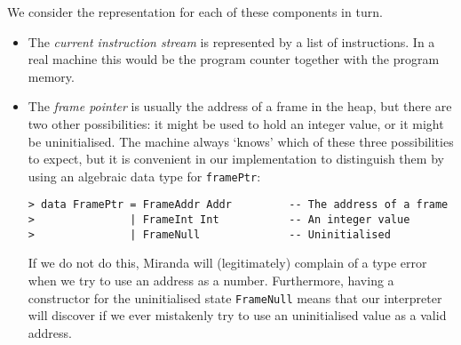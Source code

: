 We consider the representation for each of these components in turn.
\begin{itemize}
\item
The {\em current instruction stream\/} is represented by a list of instructions.
In a real machine this would be the program counter together with
the program memory.

\item
The {\em frame pointer\/} is usually the
address of a frame in the heap, but there are two other possibilities:
it might be used to hold an integer value, or it might be
uninitialised.  The machine always `knows' which of these three
possibilities to expect, but it is
convenient in our implementation to distinguish them by using an
algebraic data type for \mbox{\tt framePtr}:
\begin{verbatim}
> data FramePtr = FrameAddr Addr         -- The address of a frame
>               | FrameInt Int           -- An integer value
>               | FrameNull              -- Uninitialised
\end{verbatim}
%
%
%
If we do not do this, Miranda will (legitimately) complain
of a type error when we try to use an address as a number.
Furthermore, having a constructor for the uninitialised state \mbox{\tt FrameNull}
means that our interpreter will discover if we ever mistakenly try to use
an uninitialised value as a valid address.


\end{itemize}
